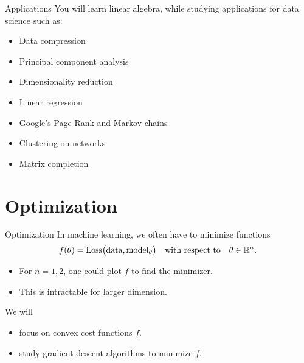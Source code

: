 \documentclass{beamer}
\begin{document}
\begin{frame}{Applications}
	You will learn linear algebra, while studying applications for data science such as:
	\vspace{0.5cm}
	\begin{itemize}
		\item Data compression 
		\item Principal component analysis 
		\item Dimensionality reduction 
		\item Linear regression 
		\item Google's Page Rank and Markov chains 
		\item Clustering on networks
		\item Matrix completion
	\end{itemize}
\end{frame}


\section{Optimization}
\begin{frame}[t]{Optimization}
	In machine learning, we often have to minimize functions
	$$
	f(\theta) = {\rm Loss}\big( {\rm data}, {\rm model}_{\theta}\big)
	\quad \text{with respect to} \quad \theta \in \mathbb{R}^n.
	$$
	\begin{itemize}
		\item For $n=1,2$, one could plot $f$ to find the minimizer.
		\item This is intractable for larger dimension.
	\end{itemize}

	\vspace{0.2cm}
	\begin{block}{We will}
		\begin{itemize}
			\item focus on convex cost functions $f$.
			\item study gradient descent algorithms to minimize $f$.
		\end{itemize}
	\end{block}
\end{frame}
\end{document}
